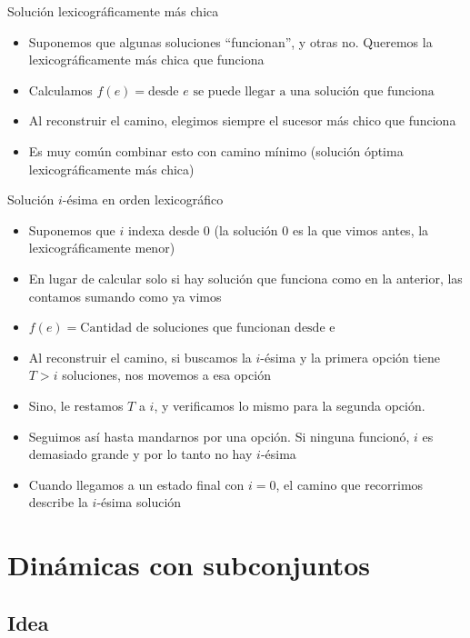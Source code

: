 \documentclass{beamer}
\begin{document}
\begin{frame}{Solución lexicográficamente más chica}
	\begin{itemize}
		\item Suponemos que algunas soluciones ``funcionan'', y otras no. Queremos la lexicográficamente más chica que funciona
		\item Calculamos $f(e) = \mbox{desde $e$ se puede llegar a una solución que funciona}$
		\item Al reconstruir el camino, elegimos siempre el sucesor más chico que funciona
		\item Es muy común combinar esto con camino mínimo (solución óptima lexicográficamente más chica)
	\end{itemize}
\end{frame}

\begin{frame}{Solución $i$-ésima en orden lexicográfico}
	\begin{itemize}
		\item Suponemos que $i$ indexa desde $0$ (la solución $0$ es la que vimos antes, la lexicográficamente menor)
		\item En lugar de calcular solo si hay solución que funciona como en la anterior, las contamos sumando como ya vimos
		\item $f(e) = \mbox{Cantidad de soluciones que funcionan desde e}$
		\item Al reconstruir el camino, si buscamos la $i$-ésima y la primera opción tiene $T > i$ soluciones, nos movemos a esa opción
		\item Sino, le restamos $T$ a $i$, y verificamos lo mismo para la segunda opción.
		\item Seguimos así hasta mandarnos por una opción. Si ninguna funcionó, $i$ es demasiado grande y por lo tanto no hay $i$-ésima
		\item Cuando llegamos a un estado final con $i=0$, el camino que recorrimos describe la $i$-ésima solución
	\end{itemize}
\end{frame}

\section{Dinámicas con subconjuntos}

\subsection{Idea}
\end{document}
